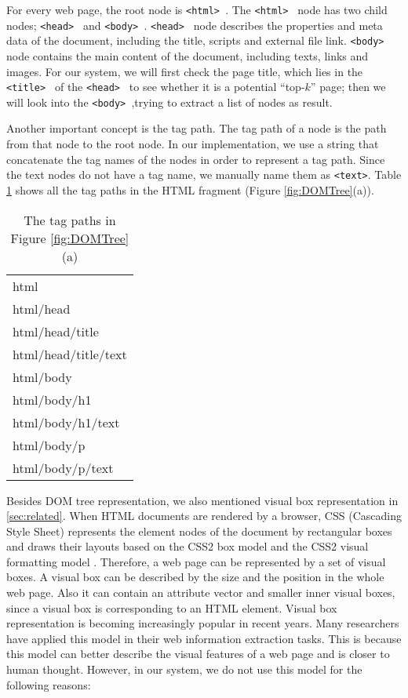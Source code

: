 For every web page, the root node is {\tt <html> }.
The {\tt <html> } node has two child nodes; {\tt <head> } and {\tt <body> }.
{\tt <head> } node describes the properties and meta data of the document,
including the title, scripts and external file link.
{\tt <body> } node contains the main content of the document, including texts, links and images.
For our system, we will first check the page title, which lies in the {\tt <title> } of the {\tt <head> } to see
whether it is a potential ``top-$k$'' page;
then we will look into the {\tt <body> },trying to extract a list of nodes as result.

Another important concept is the tag path.
The tag path of a node is the path from that node to the root node.
In our implementation,
we use a string that concatenate the tag names of the nodes in order
to represent a tag path.
Since the text nodes do not have a tag name, we manually name them as {\tt <text>}.
Table \ref{tab:tagpath} shows all the tag paths in the HTML fragment (Figure \ref{fig:DOMTree}(a)).

\begin{table}
\centering
\caption{The tag paths in Figure \ref{fig:DOMTree}(a)}
\begin{tabular}{|l|} \hline
html\\
html/head\\
html/head/title\\
html/head/title/text\\
html/body\\
html/body/h1\\
html/body/h1/text\\
html/body/p\\
html/body/p/text\\
\hline
\end{tabular}
\label{tab:tagpath}
\end{table}

Besides DOM tree representation, we also mentioned visual box representation in \ref{sec:related}.
When HTML documents are
rendered by a browser, CSS (Cascading Style Sheet)
represents the element nodes of the document by rectangular boxes
and draws their layouts based on the CSS2 box model and the CSS2 visual formatting model \cite{CCS2Box}.
Therefore, a web page can be represented by a set of visual boxes.
A visual box can be described by the size and the position in the whole web page.
Also it can contain an attribute vector and smaller inner visual boxes,
since a visual box is corresponding to an HTML element.
Visual box representation is becoming increasingly popular in recent years.
Many researchers have applied this model in
their web information extraction tasks\cite{GatterbauerBHKP2007:Towards,FumarolaWBMH11:List}.
This is because this model can better describe the visual features of a web page
and is closer to human thought.
However, in our system, we do not use this model for the following reasons:

